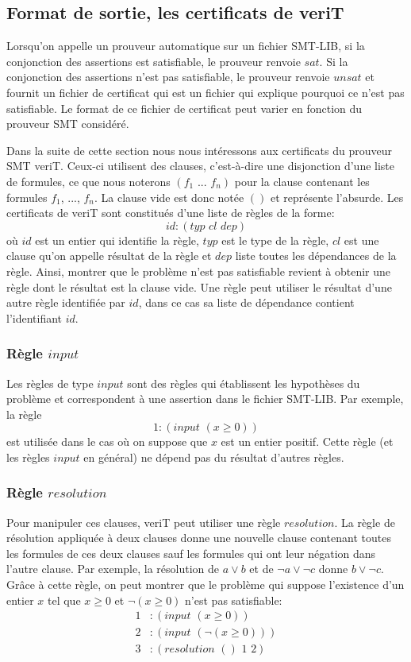 \documentclass[11pt]{article}
\begin{document}
\subsection{Format de sortie, les certificats de veriT} \label{sortie}

Lorsqu'on appelle un prouveur automatique sur un fichier SMT-LIB, si la conjonction des assertions est satisfiable, le prouveur renvoie $sat$. Si la conjonction des assertions n'est pas satisfiable, le prouveur renvoie $unsat$ et fournit un fichier de certificat qui est un fichier qui explique pourquoi ce n'est pas satisfiable. Le format de ce fichier de certificat peut varier en fonction du prouveur SMT considéré. \medbreak

Dans la suite de cette section nous nous intéressons aux certificats du prouveur SMT veriT. Ceux-ci utilisent des clauses, c'est-à-dire une disjonction d'une liste de formules, ce que nous noterons $(f_1 \,\,  ... \,\, f_n)$ pour la clause contenant les formules $f_1$, ..., $f_n$. La clause vide est donc notée $()$ et représente l'absurde. Les certificats de veriT sont constitués d'une liste de règles de la forme: 
\[id:(typ \,\, cl \,\, dep)\] 
où $id$ est un entier qui identifie la règle, $typ$ est le type de la règle, $cl$ est une clause qu'on appelle résultat de la règle et $dep$ liste toutes les dépendances de la règle.  Ainsi, montrer que le problème n'est pas satisfiable revient à obtenir une règle dont le résultat est la clause vide. Une règle peut utiliser le résultat d'une autre règle identifiée par $id$, dans ce cas sa liste de dépendance contient l'identifiant $id$.

\subsubsection{Règle $input$}

Les règles de type $input$ sont des règles qui établissent les hypothèses du problème et correspondent à une assertion dans le fichier SMT-LIB. Par exemple, la règle 
\[ 1:(input \,\, (x \geq 0)) \]
est utilisée dans le cas où on suppose que $x$ est un entier positif. Cette règle (et les règles $input$ en général) ne dépend pas du résultat d'autres règles.\medbreak

\subsubsection{Règle $resolution$}

Pour manipuler ces clauses, veriT peut utiliser une règle $resolution$. La règle de résolution appliquée à deux clauses donne une nouvelle clause contenant toutes les formules de ces deux clauses sauf les formules qui ont leur négation dans l'autre clause. Par exemple, la résolution de $a \vee b$ et de $\neg a \vee \neg c$ donne $b \vee \neg c$. Grâce à cette règle, on peut montrer que le problème qui suppose l'existence d'un entier $x$ tel que $x \geq 0$ et $\neg (x \geq 0)$ n'est pas satisfiable: 
\begin{align*}
1&:(input \,\, ( x \geq 0)) \\
2&:(input \,\, (\neg (x \geq 0))) \\
3&:(resolution \,\,() \,\,1\,\, 2)
\end{align*}
\end{document}
